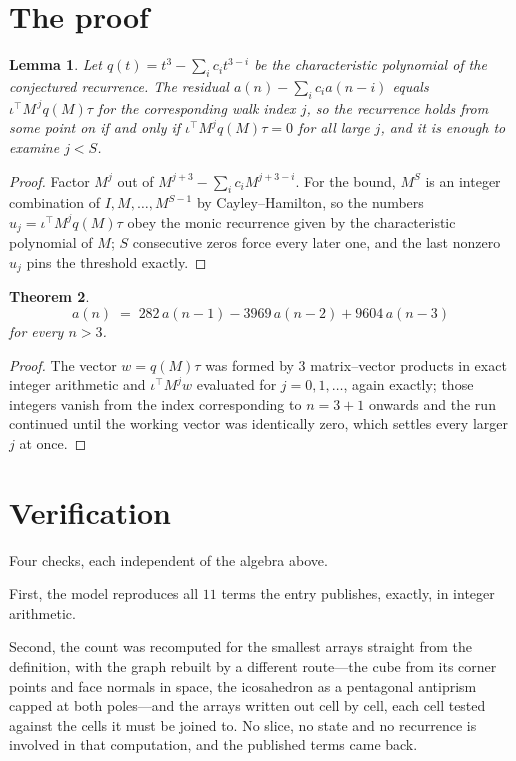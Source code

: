 \documentclass[11pt,a4paper]{article}
\theoremstyle{plain}
\newtheorem{theorem}{Theorem}
\newtheorem{lemma}[theorem]{Lemma}
\theoremstyle{definition}
\begin{document}
\section{The proof}

\begin{lemma}\label{lem:crit}
Let $q(t)=t^{3}-\sum_i c_it^{3-i}$ be the characteristic polynomial of the
conjectured recurrence. The residual $a(n)-\sum_ic_ia(n-i)$ equals
$\iota^{\!\top}M^{\,j}q(M)\tau$ for the corresponding walk index $j$, so the recurrence
holds from some point on if and only if $\iota^{\!\top}M^{j}q(M)\tau=0$ for all large $j$,
and it is enough to examine $j<S$.
\end{lemma}

\begin{proof}
Factor $M^{j}$ out of $M^{j+3}-\sum_ic_iM^{j+3-i}$. For the bound, $M^{S}$
is an integer combination of $I,M,\dots,M^{S-1}$ by Cayley--Hamilton, so the numbers
$u_j=\iota^{\!\top}M^{j}q(M)\tau$ obey the monic recurrence given by the characteristic
polynomial of $M$; $S$ consecutive zeros force every later one, and the last nonzero $u_j$
pins the threshold exactly.
\end{proof}

\begin{theorem}
\[
a(n)\;=\;282\,a(n-1) - 3969\,a(n-2) + 9604\,a(n-3)
\]
for every $n>3$.
\end{theorem}

\begin{proof}
The vector $w=q(M)\tau$ was formed by $3$ matrix--vector products in exact integer
arithmetic and $\iota^{\!\top}M^{j}w$ evaluated for $j=0,1,\dots$, again exactly; those
integers vanish from the index corresponding to $n=3+1$ onwards and the run continued
until the working vector was identically zero, which settles every larger $j$ at once.
\end{proof}

\section{Verification}

Four checks, each independent of the algebra above.

First, the model reproduces all $11$ terms the entry publishes, exactly, in integer
arithmetic.

Second, the count was recomputed for the smallest arrays straight from the definition, with the
graph rebuilt by a different route---the cube from its corner points and face normals in space,
the icosahedron as a pentagonal antiprism capped at both poles---and the arrays written out cell
by cell, each cell tested against the cells it must be joined to. No slice, no state and no
recurrence is involved in that computation, and the published terms came back.
\end{document}
